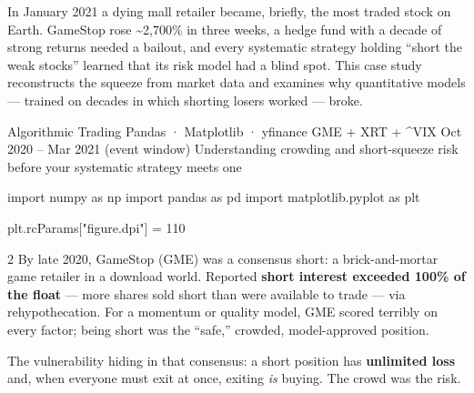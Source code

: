 \documentclass{pyportfolios-note}
\begin{document}
\thispagestyle{notecover}




In January 2021 a dying mall retailer became, briefly, the most traded stock on
Earth. GameStop rose \textasciitilde2,700\% in three weeks, a hedge fund with a
decade of strong returns needed a bailout, and every systematic strategy holding
``short the weak stocks'' learned that its risk model had a blind spot. This
case study reconstructs the squeeze from market data and examines why
quantitative models — trained on decades in which shorting losers worked —
broke.

\notecard
  {Algorithmic Trading}
  {Pandas · Matplotlib · yfinance}
  {GME + XRT + \^{}VIX}
  {Oct 2020 – Mar 2021 (event window)}
  {Understanding crowding and short-squeeze risk before your systematic strategy
   meets one}

\begin{notecode}
import numpy as np
import pandas as pd
import matplotlib.pyplot as plt

plt.rcParams["figure.dpi"] = 110
\end{notecode}

\noteneedroom{170bp}

\begin{multicols}{2}
By late 2020, GameStop (GME) was a consensus short: a brick-and-mortar game
retailer in a download world. Reported \textbf{short interest exceeded 100\% of
the float} — more shares sold short than were available to trade — via
rehypothecation. For a momentum or quality model, GME scored terribly on every
factor; being short was the ``safe,'' crowded, model-approved position.

The vulnerability hiding in that consensus: a short position has \textbf{unlimited
loss} and, when everyone must exit at once, exiting \textit{is} buying. The crowd
was the risk.
\end{multicols}

\noteneedroom{200bp}
\end{document}
